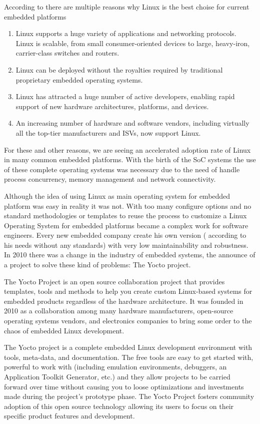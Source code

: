 According to \cite{Hallinan} there are multiple reasons why Linux is the best choise
for current embedded platforms 

\begin{enumerate}
\item Linux supports a huge variety of applications and networking protocols.
Linux is scalable, from small consumer-oriented devices to large, heavy-iron,
carrier-class switches and routers.
\item Linux can be deployed without the royalties required by traditional proprietary
embedded operating systems.
\item Linux has attracted a huge number of active developers, enabling rapid support
of new hardware architectures, platforms, and devices.
\item An increasing number of hardware and software vendors, including virtually all
the top-tier manufacturers and ISVs, now support Linux.
\end{enumerate}

For these and other reasons, we are seeing an accelerated adoption rate of
Linux in many common embedded platforms. With the birth of the SoC systems the
use of these complete operating systems was necessary due to the need of handle
process concurrency, memory management and network connectivity.

Although the idea of using Linux as main operating system for embedded platform
was easy in reality it was not. With too many configure options and no standard
methodologies or templates to reuse the process to customize a Linux Operating
System for embedded platforms became a complex work for software engineers.
Every new embedded company create his own version ( according to his needs
without any standards) with very low maintainability and robustness. In 2010
there was a change in the industry of embedded systems, the announce of a
project to solve these kind of problems: The Yocto project.

The Yocto Project is an open source collaboration project that provides
templates, tools and methods to help you create custom Linux-based systems for
embedded products regardless of the hardware architecture\cite{yocto-project}.
It was founded in 2010 as a collaboration among many hardware manufacturers,
open-source operating systems vendors, and electronics companies to bring some
order to the chaos of embedded Linux development.\cite{Leppakoski}

The Yocto project  is a  complete embedded Linux development environment with
tools, meta-data, and documentation. The free tools are easy to get started
with, powerful to work with (including emulation environments, debuggers, an
Application Toolkit Generator, etc.) and they allow projects to be carried
forward over time without causing you to loose optimizations and investments
made during the project's prototype phase. The Yocto Project fosters community
adoption of this open source technology allowing its users to focus on their
specific product features and development.

